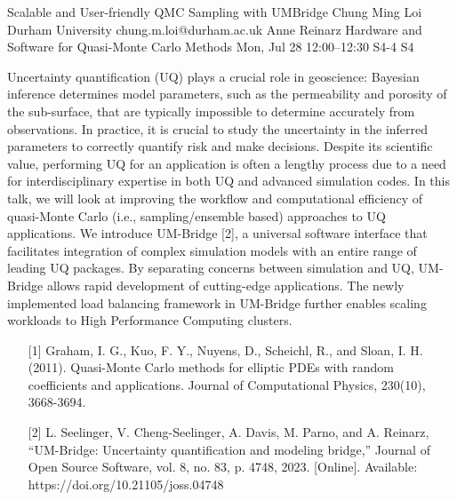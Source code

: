 \begin{talk}
  {Scalable and User-friendly QMC Sampling with UMBridge}%
  {Chung Ming Loi}%
  {Durham University}%
  {chung.m.loi@durham.ac.uk}%
  {Anne Reinarz}%
  {Hardware and Software for Quasi-Monte Carlo Methods}%
  {Mon, Jul 28 12:00–12:30}%
  {S4-4}%
  {S4}%
				
			
Uncertainty quantification (UQ) plays a crucial role in geoscience: Bayesian inference determines model parameters, such as the permeability and porosity of the sub-surface, that are typically impossible to determine accurately from observations. In practice, it is crucial to study the uncertainty in the inferred parameters to correctly quantify risk and make decisions. Despite its scientific value, performing UQ for an application is often a lengthy process due to a need for interdisciplinary expertise in both UQ and advanced simulation codes. In this talk, we will look at improving the workflow and computational efficiency of quasi-Monte Carlo (i.e., sampling/ensemble based) approaches to UQ applications. We introduce UM-Bridge [2], a universal software interface that facilitates integration of complex simulation models with an entire range of leading UQ packages. By separating concerns between simulation and UQ, UM-Bridge allows rapid development of cutting-edge applications. The newly implemented load balancing framework in UM-Bridge further enables scaling workloads to High Performance Computing clusters.

\begin{enumerate}
    \item[{[1]}] Graham, I. G., Kuo, F. Y., Nuyens, D., Scheichl, R., and Sloan, I. H. (2011). Quasi-Monte Carlo methods for elliptic PDEs with random coefficients and applications. Journal of Computational Physics, 230(10), 3668-3694.
    \item[{[2]}]  L. Seelinger, V. Cheng-Seelinger, A. Davis, M. Parno, and A. Reinarz, “UM-Bridge: Uncertainty quantification and modeling bridge,” Journal of Open Source Software, vol. 8, no. 83, p. 4748, 2023. [Online]. Available: https://doi.org/10.21105/joss.04748
\end{enumerate}

\end{talk}

